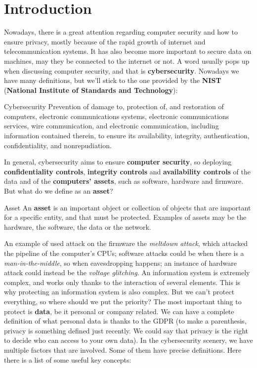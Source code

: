 \chapter{Introduction} 

Nowadays, there is a great attention regarding computer security and how to ensure privacy, mostly because of the rapid growth of internet and telecommunication systems. It has also become more important to secure data on machines, may they be connected to the internet or not. A word usually pops up when discussing computer security, and that is \textbf{cybersecurity}. Nowadays we have many definitions, but we'll stick to the one provided by the \textbf{NIST} (\textbf{National Institute of Standards and Technology}):

\begin{definition}{Cybersecurity}
    Prevention of damage to, protection of, and restoration of computers, electronic communications systems, electronic communications services, wire communication, and electronic communication, including information contained therein, to ensure its availability, integrity, authentication, confidentiality, and nonrepudiation.
\end{definition}

In general, cybersecurity aims to ensure \textbf{computer security}, so deploying \textbf{confidentiality controls}, \textbf{integrity controls} and \textbf{availability controls} of the data and of the \textbf{computers' assets}, such as software, hardware and firmware. But what do we define as an \textbf{asset}?

\begin{definition}{Asset}
    An \textbf{asset} is an important object or collection of objects that are important for a specific entity, and that must be protected. Examples of assets may be the hardware, the software, the data or the network.
\end{definition}

An example of used attack on the firmware the \textit{meltdown attack}, which attacked the pipeline of the computer's CPUs; software attacks could be when there is a \textit{man-in-the-middle}, so when eavesdropping happens; an instance of hardware attack could instead be the \textit{voltage glitching}.
\nl
An information system is extremely complex, and works only thanks to the interaction of several elements. This is why protecting an information system is also complex. But we can't protect everything, so where should we put the priority?
\nl
The most important thing to protect is \textbf{data}, be it personal or company related. We can have a complete definition of what personal data is thanks to the GDPR (to make a parenthesis, privacy is something defined just recently. We could say that privacy is the right to decide who can access to your own data).
\nl
In the cybersecurity scenery, we have multiple factors that are involved. Some of them have precise definitions. Here there is a list of some useful key concepts:


